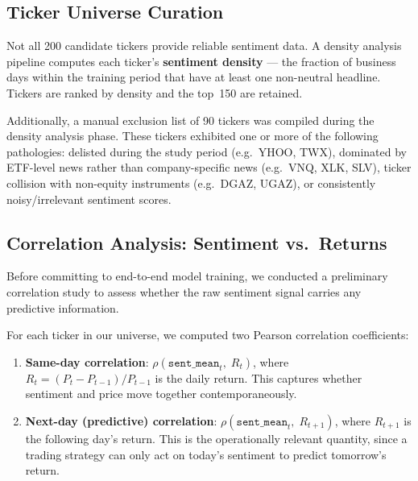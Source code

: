 \subsection{Ticker Universe Curation}
\label{sec:ticker-curation}

Not all 200 candidate tickers provide reliable sentiment data.  A density
analysis pipeline computes each ticker's \textbf{sentiment density} --- the
fraction of business days within the training period that have at least one
non-neutral headline.  Tickers are ranked by density and the top~150 are
retained.

Additionally, a manual exclusion list of 90 tickers was compiled during the
density analysis phase.  These tickers exhibited one or more of the following
pathologies: delisted during the study period (e.g.\ YHOO, TWX), dominated
by ETF-level news rather than company-specific news (e.g.\ VNQ, XLK, SLV),
ticker collision with non-equity instruments (e.g.\ DGAZ, UGAZ), or
consistently noisy/irrelevant sentiment scores.

\subsection{Correlation Analysis: Sentiment vs.\ Returns}
\label{sec:correlation-analysis}

Before committing to end-to-end model training, we conducted a preliminary
correlation study to assess whether the raw sentiment signal carries any
predictive information.

For each ticker in our universe, we computed two Pearson correlation
coefficients:

\begin{enumerate}
  \item \textbf{Same-day correlation}: $\rho(\texttt{sent\_mean}_t,\; R_t)$,
        where $R_t = (P_t - P_{t-1}) / P_{t-1}$ is the daily return.  This
        captures whether sentiment and price move together contemporaneously.

  \item \textbf{Next-day (predictive) correlation}:
        $\rho(\texttt{sent\_mean}_t,\; R_{t+1})$, where $R_{t+1}$ is the
        following day's return.  This is the operationally relevant quantity,
        since a trading strategy can only act on today's sentiment to predict
        tomorrow's return.
\end{enumerate}

